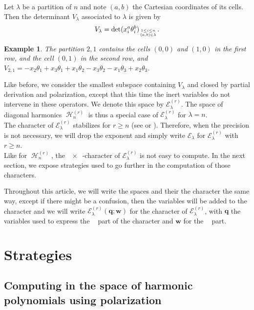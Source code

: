 \documentclass[letter,12pt]{article}
\DeclareMathOperator{\Sn}{\mathbb{S}_n}
\DeclareMathOperator{\GLr}{GL_r}
\DeclareMathOperator{\harmonics}{\mathcal{H}}
\newtheorem{example}{Example}
\begin{document}
	Let $\lambda$ be a partition of $n$ and note $(a,b)$ the Cartesian coordinates of its cells. Then the determinant $V_{\lambda}$ associated to $\lambda$ is given by $$V_{\lambda} = \det (x_i^a \theta_i^b)_{1 \leq i \leq n \atop (a,b) \in \lambda} .$$
	
	\begin{example}
		The partition $2,1$ contains the cells $(0,0)$ and $(1,0)$ in the first row, and the cell $(0,1)$ in the second row, and $V_{2,1} = -x_2\theta_1 + x_3\theta_1 + x_1\theta_2 - x_3\theta_2 - x_1\theta_3 + x_2\theta_3$. 
	\end{example}

	
	Like before, we consider the smallest subspace containing $V_{\lambda}$ and closed by partial derivation and polarization, except that this time the inert variables do not intervene in these operators. We denote this space by $\mathcal{E}_{\lambda}^{(r)}$. The space of diagonal harmonics $\harmonics_n^{(r)}$ is thus a special case of $\mathcal{E}_{\lambda}^{(r)}$ for $\lambda = n$. \\
	
	The character of $\mathcal{E}_{\lambda}^{(r)}$ stabilizes for $r \geq n$ (see \cite{Bergeron2013} or \cite{Bergeron2009}). Therefore, when the precision is not necessary, we will drop the exponent and simply write $\mathcal{E}_{\lambda}$ for $\mathcal{E}_{\lambda}^{(r)}$ with $r \geq n$. \\
	
	Like for $\harmonics_n^{(r)}$, the $\GLr \times \Sn$-character of $\mathcal{E}_\lambda^{(r)}$ is not easy to compute. In the next section, we expose strategies used to go further in the computation of those characters. 
	
	Throughout this article, we will write the spaces and their the character the same way, except if there might be a confusion, then the variables will be added to the character and we will write $\mathcal{E}_\lambda^{(r)}(\bm{q};\bm{w})$ for the character of $\mathcal{E}_\lambda^{(r)}$,  with $\bm{q}$ the variables used to express the $\GLr$ part of the character and $\bm{w}$ for the $\Sn$ part. 
	
	
	\section{Strategies}
	
	\subsection{Computing in the space of harmonic polynomials using polarization}
	
\end{document}
